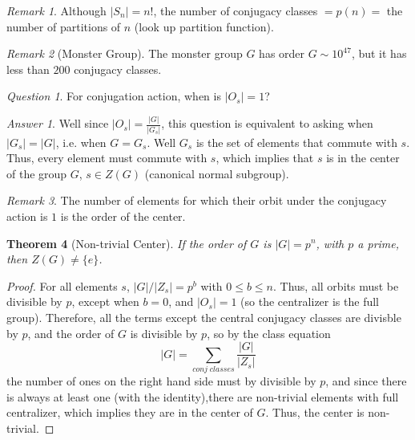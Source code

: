 \documentclass[12pt]{article}
\newtheorem{thm}{Theorem}[section]
\theoremstyle{definition}
\theoremstyle{remark}
\newtheorem{rmk}[thm]{Remark}
\newtheorem*{qst}{Question}
\newtheorem*{ans}{Answer}
\numberwithin{equation}{section}
\begin{document}
\vspace{15pt}

\begin{rmk}
        Although $|S_n| = n!$, the number of conjugacy classes $= p(n) = $ the number of partitions of $n$ (look up partition function).
\end{rmk}


\vspace{15pt}

\begin{rmk}[Monster Group]
        The monster group $G$ has order $G \sim 10^{47}$, but it has less than $200$ conjugacy classes.
\end{rmk}


\vspace{15pt}

\begin{qst}
        For conjugation action, when is $|O_s| = 1$?
\end{qst}
\begin{ans}
        Well since $|O_s| = \frac{|G|}{|G_s|}$, this question is equivalent to asking when $|G_s| = |G|$, i.e. when $G = G_s$. Well $G_s$ is the set of elements that commute with $s$. Thus, every element must commute with $s$, which implies that $s$ is in the center of the group $G$, $s \in Z(G)$ (canonical normal subgroup).
\end{ans}

\vspace{15pt}

\begin{rmk}
        The number of elements for which their orbit under the conjugacy action is $1$ is the order of the center.
\end{rmk}


\vspace{15pt}

\begin{thm}[Non-trivial Center]
        If the order of $G$ is $|G| = p^n$, with $p$ a prime, then $Z(G) \neq \{e\}$. 
\end{thm}
\begin{proof}
        For all elements $s$, $|G|/|Z_s| = p^b$ with $0 \leq b \leq n$. Thus, all orbits must be divisible by $p$, except when $b = 0$, and $|O_s| = 1$ (so the centralizer is the full group). Therefore, all the terms except the central conjugacy classes are divisble by $p$, and the order of $G$ is divisible by $p$, so by the class equation \begin{equation}
                |G| = \sum\limits_{conj\;classes}\frac{|G|}{|Z_s|}
        \end{equation}
        the number of ones on the right hand side must by divisible by $p$, and since there is always at least one (with the identity),there are non-trivial elements with full centralizer, which implies they are in the center of $G$. Thus, the center is non-trivial.
\end{proof}
\end{document}
